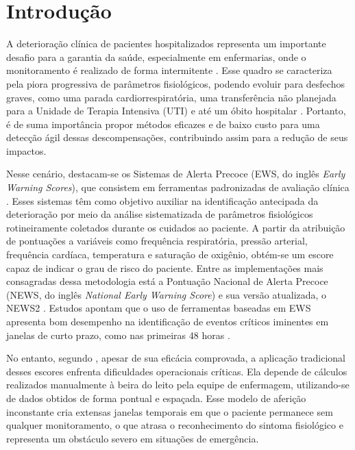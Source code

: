  \section{Introdução}

A deterioração clínica de pacientes hospitalizados representa um importante desafio para a garantia da saúde, especialmente em enfermarias, onde o monitoramento é realizado de forma intermitente \cite{vincent2018deterioracao}. Esse quadro se caracteriza pela piora progressiva de parâmetros fisiológicos, podendo evoluir para desfechos graves, como uma parada cardiorrespiratória, uma transferência não planejada para a Unidade de Terapia Intensiva (UTI) e até um óbito hospitalar \cite{gerry2020ews}. Portanto, é de suma importância propor métodos eficazes e de baixo custo para uma detecção ágil dessas descompensações, contribuindo assim para a redução de seus impactos.

Nesse cenário, destacam-se os Sistemas de Alerta Precoce (EWS, do inglês \textit{Early Warning Scores}), que consistem em ferramentas padronizadas de avaliação clínica \cite{ALAM2014587}. Esses sistemas têm como objetivo auxiliar na identificação antecipada da deterioração por meio da análise sistematizada de parâmetros fisiológicos rotineiramente coletados durante os cuidados ao paciente. A partir da atribuição de pontuações a variáveis como frequência respiratória, pressão arterial, frequência cardíaca, temperatura e saturação de oxigênio, obtém-se um escore capaz de indicar o grau de risco do paciente. Entre as implementações mais consagradas dessa metodologia está a Pontuação Nacional de Alerta Precoce (NEWS, do inglês \textit{National Early Warning Score}) e sua versão atualizada, o NEWS2 \cite{gerry2020ews}. Estudos apontam que o uso de ferramentas baseadas em EWS apresenta bom desempenho na identificação de eventos críticos iminentes em janelas de curto prazo, como nas primeiras 48 horas \cite{smith2014ews}.

No entanto, segundo , apesar de sua eficácia comprovada, a aplicação tradicional desses escores enfrenta dificuldades operacionais críticas. Ela depende de cálculos realizados manualmente à beira do leito pela equipe de enfermagem, utilizando-se de dados obtidos de forma pontual e espaçada. Esse modelo de aferição inconstante cria extensas janelas temporais em que o paciente permanece sem qualquer monitoramento, o que atrasa o reconhecimento do sintoma fisiológico e representa um obstáculo severo em situações de emergência.

